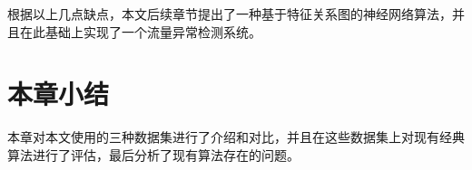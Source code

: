 根据以上几点缺点，本文后续章节提出了一种基于特征关系图的神经网络算法，并且在此基础上实现了一个流量异常检测系统。

\section{本章小结}
本章对本文使用的三种数据集进行了介绍和对比，并且在这些数据集上对现有经典算法进行了评估，最后分析了现有算法存在的问题。

  
  
  
  
  
  







